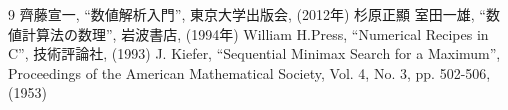 \documentclass[a4j,12pt]{jarticle}
\title{\論文題目}
\author{\氏名}
\date{} %
\theoremstyle{definition}
\numberwithin{equation}{section}
\newcommand{\卒業年度}{7}
\newcommand{\論文題目}{最良近似多項式の導出と\\アルゴリズム}    %
\newcommand{\氏名}{imohiyoko}        %
\newcommand{\指導教員}{（指導教員）}    %
\begin{document}
\newpage  %





\tableofcontents
\clearpage

















\begin{thebibliography}{9}
   齊藤宣一, ``数値解析入門'', 東京大学出版会, (2012年)
   杉原正顯 室田一雄, ``数値計算法の数理'', 岩波書店, (1994年)
   William H.Press, ``Numerical Recipes in C'', 技術評論社, (1993)
   J. Kiefer, ``Sequential Minimax Search for a Maximum'', Proceedings of the American Mathematical Society, Vol. 4, No. 3, pp. 502-506, (1953)
\end{thebibliography}
\end{document}
